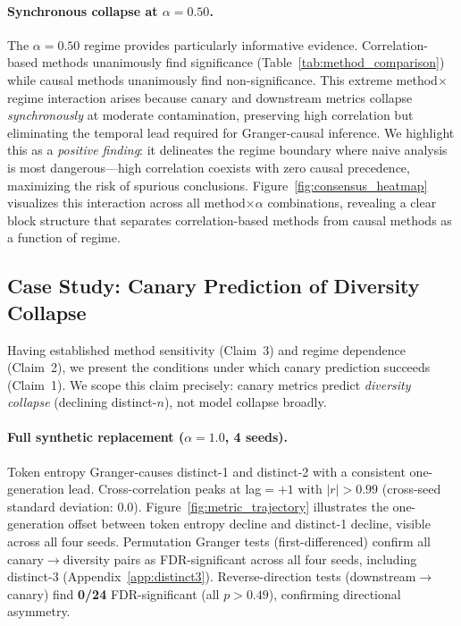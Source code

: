 \paragraph{Synchronous collapse at $\alpha{=}0.50$.}
The $\alpha{=}0.50$ regime provides particularly informative evidence.
Correlation-based methods unanimously find significance (Table~\ref{tab:method_comparison}) while causal methods unanimously find non-significance.
This extreme method$\times$regime interaction arises because canary and downstream metrics collapse \emph{synchronously} at moderate contamination, preserving high correlation but eliminating the temporal lead required for Granger-causal inference.
We highlight this as a \emph{positive finding}: it delineates the regime boundary where naive analysis is most dangerous---high correlation coexists with zero causal precedence, maximizing the risk of spurious conclusions.
Figure~\ref{fig:consensus_heatmap} visualizes this interaction across all method$\times\alpha$ combinations, revealing a clear block structure that separates correlation-based methods from causal methods as a function of regime.


\subsection{Case Study: Canary Prediction of Diversity Collapse}
\label{sec:case_study}

Having established method sensitivity (Claim~3) and regime dependence (Claim~2), we present the conditions under which canary prediction succeeds (Claim~1).
We scope this claim precisely: canary metrics predict \emph{diversity collapse} (declining distinct-$n$), not model collapse broadly.

\paragraph{Full synthetic replacement ($\alpha{=}1.0$, 4 seeds).}
Token entropy Granger-causes distinct-1 and distinct-2 with a consistent one-generation lead.
Cross-correlation peaks at lag$={+}1$ with $|r|{>}0.99$ (cross-seed standard deviation: 0.0).
Figure~\ref{fig:metric_trajectory} illustrates the one-generation offset between token entropy decline and distinct-1 decline, visible across all four seeds.
Permutation Granger tests (first-differenced) confirm all canary$\to$diversity pairs as FDR-significant across all four seeds, including distinct-3 (Appendix~\ref{app:distinct3}).
Reverse-direction tests (downstream$\to$canary) find \textbf{0/24} FDR-significant (all $p{>}0.49$), confirming directional asymmetry.

